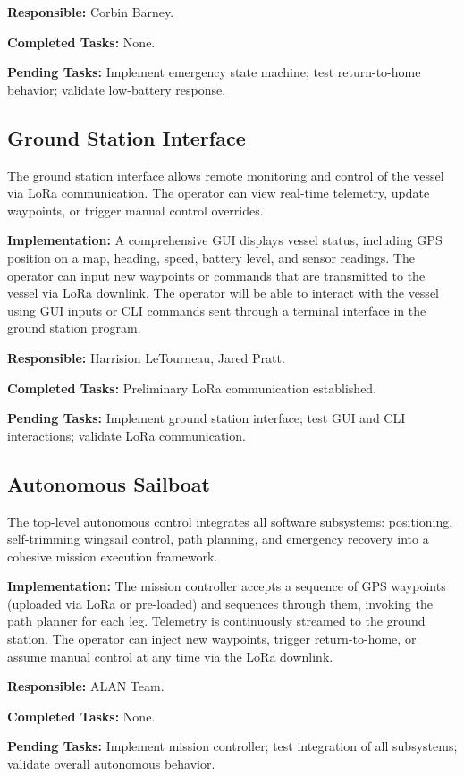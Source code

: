 \textbf{Responsible:} Corbin Barney.

\textbf{Completed Tasks:} None.

\textbf{Pending Tasks:} Implement emergency state machine; test return-to-home behavior; validate low-battery response.


\subsection{Ground Station Interface}

The ground station interface allows remote monitoring and control of the vessel via LoRa communication. The operator can view real-time telemetry, update waypoints, or trigger manual control overrides.

\textbf{Implementation:} A comprehensive GUI displays vessel status, including GPS position on a map, heading, speed, battery level, and sensor readings. The operator can input new waypoints or commands that are transmitted to the vessel via LoRa downlink. The operator will be able to interact with the vessel using GUI inputs or CLI commands sent through a terminal interface in the ground station program.

\textbf{Responsible:} Harrision LeTourneau, Jared Pratt.

\textbf{Completed Tasks:} Preliminary LoRa communication established.

\textbf{Pending Tasks:} Implement ground station interface; test GUI and CLI interactions; validate LoRa communication.


\subsection{Autonomous Sailboat}

The top-level autonomous control integrates all software subsystems: positioning, self-trimming wingsail control, path planning, and emergency recovery into a cohesive mission execution framework.

\textbf{Implementation:} The mission controller accepts a sequence of GPS waypoints (uploaded via LoRa or pre-loaded) and sequences through them, invoking the path planner for each leg. Telemetry is continuously streamed to the ground station. The operator can inject new waypoints, trigger return-to-home, or assume manual control at any time via the LoRa downlink.

\textbf{Responsible:} ALAN Team.

\textbf{Completed Tasks:} None.

\textbf{Pending Tasks:} Implement mission controller; test integration of all subsystems; validate overall autonomous behavior.

